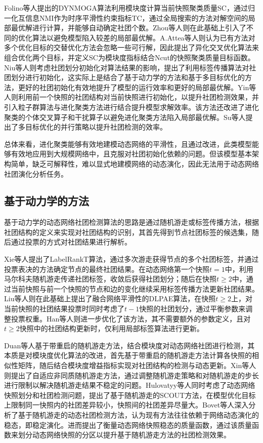 Folino等人\cite{folino2013evolutionary}提出的DYNMOGA算法利用模块度计算当前快照聚类质量SC，通过归一化互信息NMI作为时序平滑性约束指标TC，通过全局搜索的方法对解空间的局部最优解进行计算，并能够自动确定社团个数。Zhou等人\cite{zhou2015multiobjective,zhou2017multiobjective}则在此基础上引入了不同的优化算法以避免模型陷入较差的局部最优解。A.Attea等人\cite{bara2016new}则认为已有方法对多个优化目标的交替优化方法会忽略一些可行解，因此提出了异化交叉优化算法来组合优化两个目标，并定义SC为模块度指标结合Ncut的快照聚类质量目标函数。Niu等人\cite{niu2017label}则考虑社团划分初始化对算法结果的影响，提出了利用标签传播算法对社团划分进行初始化，这实际上是结合了基于动力学的方法和基于多目标优化的方法，更好的社团初始化有效地提升了模型的运行效率和更好的局部最优解。Yin等人\cite{yin2021multi}则利用前一个快照的社团结构对当前快照进行初始化，以提升社团检测效果，并引入粒子群算法与进化聚类方法进行结合提升模型求解效率。该方法还改进了进化聚类的个体交叉算子和干扰算子以避免进化聚类方法陷入局部最优解。Su等人\cite{su2021parallel}提出了多目标优化的并行策略以提升社团检测的效率。

总体来看，进化聚类能够有效地建模动态网络的平滑性，且通过改进，此类模型能够有效地应用到大规模网络中，且克服对社团初始化依赖的问题。但该模型基本架构简单，缺乏可解释性，难以显式地建模网络的动态演化，因此无法用于动态网络社团演化分析任务。

\subsection{基于动力学的方法}

基于动力学的动态网络社团检测算法的思路是通过随机游走或标签传播方法，根据社团结构的定义来实现对社团结构的识别，其首先得到节点社团标签的候选集，随后通过投票的方式对社团结果进行解析。

Xie等人\cite{xie2013labelrankt}提出了LabelRankT算法，通过多次游走获得节点的多个社团标签，并通过投票表决的方法确定节点的最终社团结果。在动态网络第一个快照$t=1$中，利用马尔科夫随机游走传递社团标签，收敛后获得社团划分；随后在快照$t \ge 2$中，通过当前快照与前一个快照的节点和边的变化继续采用标签传播方法更新社团结果。Liu等人\cite{liu2015label}则在此基础上提出了融合网络平滑性的DLPAE算法，在快照$t \ge 2$上，对当前快照的社团结果投票时同时考虑了$t-1$快照的社团划分，通过平衡参数来调整投票权重。Han等人\cite{han2017community}则进一步优化了该方法，其不需要额外的参数定义，且对$t \ge 2$快照中的社团结构更新时，仅利用局部标签算法进行更新。

Duan等人\cite{duan2009community}基于带重启的随机游走方法，结合模块度对动态网络社团进行检测，其本质是对模块度优化算法的改进，首先基于带重启的随机游走方法计算各快照的相似性矩阵，随后结合模块度增益指标实现对社团结构的检测与动态更新。Xin等人\cite{xin2016adaptive}则提出了自适应非同质随机游走方法，通过调整随机游走策略和对随机游走的步长进行限制以解决随机游走结果不稳定的问题。Hulovatyy等人\cite{hulovatyy2016scout}同时考虑了动态网络快照划分和社团检测问题，提出了基于随机游走的SCOUT方法，在模型优化目标上限制同一快照内的社团差异较小，快照间的社团差异尽量大。Bovet等人\cite{doi:10.1126/sciadv.abj3063}深入分析了基于随机游走的动态社团检测方法，认为现有方法往往依赖于网络动态演化的稳态，即稳定演化。进而提出了衡量动态网络快照稳态的质量函数，通过该质量函数来划分动态网络快照的分区以提升基于随机游走方法的社团检测效果。


